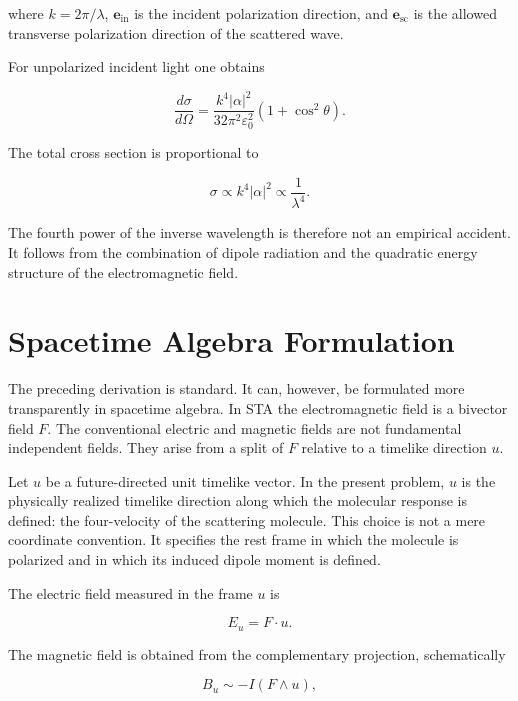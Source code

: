 \documentclass[11pt,a4paper]{article}
\begin{document}
where \(k=2\pi/\lambda\), \(\mathbf{e}_{\mathrm{in}}\) is the incident
polarization direction, and \(\mathbf{e}_{\mathrm{sc}}\) is the allowed
transverse polarization direction of the scattered wave.

For unpolarized incident light one obtains

\begin{equation}
\frac{d\sigma}{d\Omega}
=
\frac{k^4 |\alpha|^2}{32\pi^2 \varepsilon_0^2}
(1+\cos^2\theta).
\end{equation}

The total cross section is proportional to

\begin{equation}
\sigma \propto k^4|\alpha|^2
\propto
\frac{1}{\lambda^4}.
\end{equation}

The fourth power of the inverse wavelength is therefore not an empirical
accident. It follows from the combination of dipole radiation and the
quadratic energy structure of the electromagnetic field.

\section{Spacetime Algebra Formulation}

The preceding derivation is standard. It can, however, be formulated more
transparently in spacetime algebra. In STA the electromagnetic field is a
bivector field \(F\). The conventional electric and magnetic fields are not
fundamental independent fields. They arise from a split of \(F\) relative to
a timelike direction \(u\).

Let \(u\) be a future-directed unit timelike vector. In the present problem,
\(u\) is the physically realized timelike direction along which the molecular
response is defined: the four-velocity of the scattering molecule. This choice
is not a mere coordinate convention. It specifies the rest frame in which the
molecule is polarized and in which its induced dipole moment is defined.

The electric field measured in the frame \(u\) is

\begin{equation}
E_u = F\cdot u.
\end{equation}

The magnetic field is obtained from the complementary projection, schematically

\begin{equation}
B_u \sim -I(F\wedge u),
\end{equation}
\end{document}
